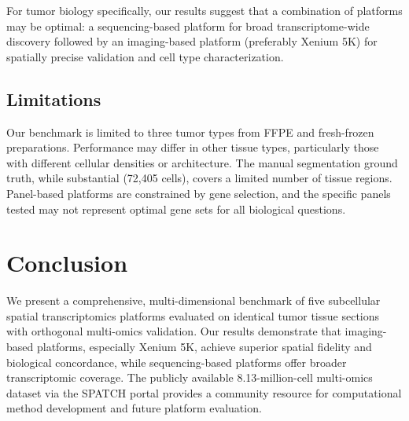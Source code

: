 \documentclass[11pt]{article}
\begin{document}
For tumor biology specifically, our results suggest that a combination of platforms may be optimal: a sequencing-based platform for broad transcriptome-wide discovery followed by an imaging-based platform (preferably Xenium 5K) for spatially precise validation and cell type characterization.

\subsection{Limitations}
Our benchmark is limited to three tumor types from FFPE and fresh-frozen preparations. Performance may differ in other tissue types, particularly those with different cellular densities or architecture. The manual segmentation ground truth, while substantial (72,405 cells), covers a limited number of tissue regions. Panel-based platforms are constrained by gene selection, and the specific panels tested may not represent optimal gene sets for all biological questions.

\section{Conclusion}

We present a comprehensive, multi-dimensional benchmark of five subcellular spatial transcriptomics platforms evaluated on identical tumor tissue sections with orthogonal multi-omics validation. Our results demonstrate that imaging-based platforms, especially Xenium 5K, achieve superior spatial fidelity and biological concordance, while sequencing-based platforms offer broader transcriptomic coverage. The publicly available 8.13-million-cell multi-omics dataset via the SPATCH portal provides a community resource for computational method development and future platform evaluation.



\end{document}
